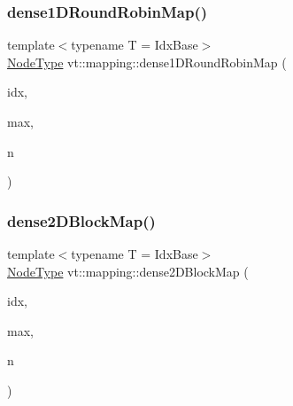 \mbox{\label{namespacevt_1_1mapping_a2a4e62c5dc17da0032d3953c7e3cde8b}} 
\subsubsection{\texorpdfstring{dense1\+D\+Round\+Robin\+Map()}{dense1DRoundRobinMap()}}
{\footnotesize\ttfamily template$<$typename T  = Idx\+Base$>$ \\
\hyperlink{namespacevt_a866da9d0efc19c0a1ce79e9e492f47e2}{Node\+Type} vt\+::mapping\+::dense1\+D\+Round\+Robin\+Map (\begin{DoxyParamCaption}\item[{\hyperlink{namespacevt_1_1mapping_a8b576cf2f31069778e4951f64bccafd8}{Idx1\+D\+Ptr}$<$ T $>$}]{idx,  }\item[{\hyperlink{namespacevt_1_1mapping_a8b576cf2f31069778e4951f64bccafd8}{Idx1\+D\+Ptr}$<$ T $>$}]{max,  }\item[{\hyperlink{namespacevt_a866da9d0efc19c0a1ce79e9e492f47e2}{Node\+Type}}]{n }\end{DoxyParamCaption})}

\mbox{\label{namespacevt_1_1mapping_aca20bcd20c24f4a43e217ca63bf5812c}} 
\subsubsection{\texorpdfstring{dense2\+D\+Block\+Map()}{dense2DBlockMap()}}
{\footnotesize\ttfamily template$<$typename T  = Idx\+Base$>$ \\
\hyperlink{namespacevt_a866da9d0efc19c0a1ce79e9e492f47e2}{Node\+Type} vt\+::mapping\+::dense2\+D\+Block\+Map (\begin{DoxyParamCaption}\item[{\hyperlink{namespacevt_1_1mapping_a6832cbb1361fe72fd7ec730e7b7773b3}{Idx2\+D\+Ptr}$<$ T $>$}]{idx,  }\item[{\hyperlink{namespacevt_1_1mapping_a6832cbb1361fe72fd7ec730e7b7773b3}{Idx2\+D\+Ptr}$<$ T $>$}]{max,  }\item[{\hyperlink{namespacevt_a866da9d0efc19c0a1ce79e9e492f47e2}{Node\+Type}}]{n }\end{DoxyParamCaption})}

